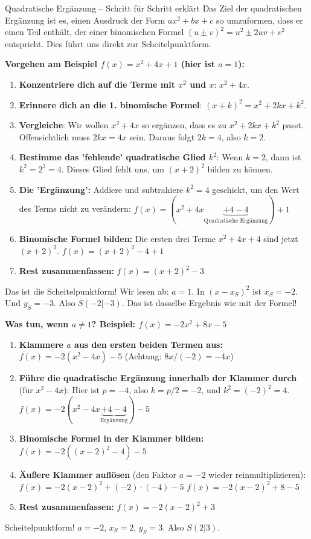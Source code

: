 \begin{infoboxumgebung}{Quadratische Ergänzung – Schritt für Schritt erklärt}
Das Ziel der quadratischen Ergänzung ist es, einen Ausdruck der Form $ax^2+bx+c$ so umzuformen, dass er einen Teil enthält, der einer binomischen Formel $(u \pm v)^2 = u^2 \pm 2uv + v^2$ entspricht. Dies führt uns direkt zur Scheitelpunktform.

\textbf{Vorgehen am Beispiel $f(x) = x^2 + 4x + 1$ (hier ist $a=1$):}
\begin{enumerate}
    \item \textbf{Konzentriere dich auf die Terme mit $x^2$ und $x$}: $x^2 + 4x$.
    \item \textbf{Erinnere dich an die 1. binomische Formel}: $(x+k)^2 = x^2 + 2kx + k^2$.
    \item \textbf{Vergleiche}: Wir wollen $x^2 + 4x$ so ergänzen, dass es zu $x^2 + 2kx + k^2$ passt.
    Offensichtlich muss $2kx = 4x$ sein. Daraus folgt $2k=4$, also $k=2$.
    \item \textbf{Bestimme das 'fehlende' quadratische Glied $k^2$}: Wenn $k=2$, dann ist $k^2 = 2^2 = 4$. Dieses Glied fehlt uns, um $(x+2)^2$ bilden zu können.
    \item \textbf{Die 'Ergänzung':} Addiere und subtrahiere $k^2=4$ geschickt, um den Wert des Terms nicht zu verändern:
    $f(x) = (x^2 + 4x \underbrace{+ 4 - 4}_{\text{Quadratische Ergänzung}}) + 1$
    \item \textbf{Binomische Formel bilden:} Die ersten drei Terme $x^2+4x+4$ sind jetzt $(x+2)^2$.
    $f(x) = (x+2)^2 - 4 + 1$
    \item \textbf{Rest zusammenfassen:}
    $f(x) = (x+2)^2 - 3$
\end{enumerate}
Das ist die Scheitelpunktform! Wir lesen ab: $a=1$. In $(x - x_S)^2$ ist $x_S = -2$. Und $y_S = -3$.
Also $S(-2|-3)$. Das ist dasselbe Ergebnis wie mit der Formel!

\textbf{Was tun, wenn $a \neq 1$? Beispiel: $f(x) = -2x^2 + 8x - 5$}
\begin{enumerate}
    \item \textbf{Klammere $a$ aus den ersten beiden Termen aus:}
    $f(x) = -2(x^2 - 4x) - 5$ \quad (Achtung: $8x / (-2) = -4x$)
    \item \textbf{Führe die quadratische Ergänzung innerhalb der Klammer durch} (für $x^2-4x$):
    Hier ist $p=-4$, also $k = p/2 = -2$, und $k^2 = (-2)^2 = 4$.
    $f(x) = -2(x^2 - 4x \underbrace{+ 4 - 4}_{\text{Ergänzung}}) - 5$
    \item \textbf{Binomische Formel in der Klammer bilden:}
    $f(x) = -2((x-2)^2 - 4) - 5$
    \item \textbf{Äußere Klammer auflösen} (den Faktor $a=-2$ wieder reinmultiplizieren):
    $f(x) = -2(x-2)^2 + (-2)\cdot(-4) - 5$
    $f(x) = -2(x-2)^2 + 8 - 5$
    \item \textbf{Rest zusammenfassen:}
    $f(x) = -2(x-2)^2 + 3$
\end{enumerate}
Scheitelpunktform! $a=-2$, $x_S=2$, $y_S=3$. Also $S(2|3)$.
\end{infoboxumgebung}
